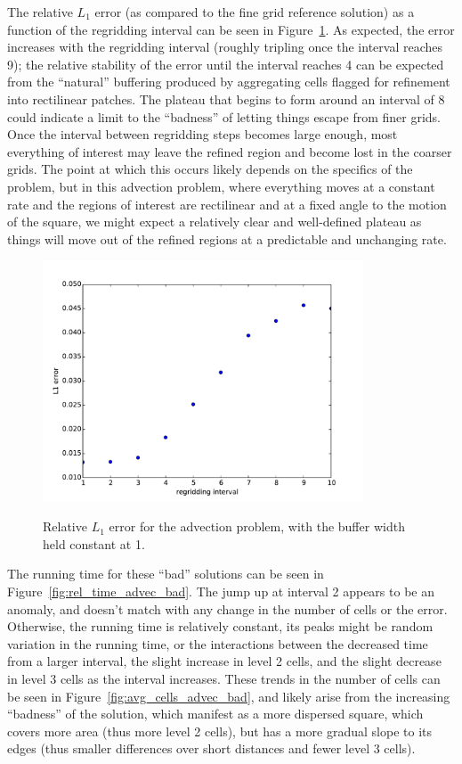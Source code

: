 \documentclass[11pt]{article}
\begin{document}
The relative $L_1$ error (as compared to the fine grid reference solution)
as a function of the regridding interval can be seen in 
Figure~\ref{fig:err_advec_bad}. As expected, the error increases with the
regridding interval (roughly tripling once the interval reaches 9); the 
relative stability of the error until the interval reaches 4 can be expected
from the ``natural'' buffering produced by aggregating cells flagged for 
refinement into rectilinear patches. 
The plateau that begins to form around an interval of 8 could indicate a limit
to the ``badness'' of letting things escape from finer grids. Once the interval
between regridding steps becomes large enough, most everything of interest
may leave the refined region and become lost in the coarser grids. The point
at which this occurs likely depends on the specifics of the problem, but in
this advection problem, where everything moves at a constant rate and the 
regions of interest are rectilinear and at a fixed angle to the motion of
the square, we might expect a relatively clear and well-defined plateau
as things will move out of the refined regions at a predictable and
unchanging rate.

\begin{figure}[!htb]
\centering
\caption{Relative $L_1$ error for the advection problem, with the buffer
width held constant at 1.}
\includegraphics[width=0.85\textwidth]{myclaw/l1_err_advec_bad}
\label{fig:err_advec_bad}
\end{figure}

The running time for these ``bad'' solutions can be seen in 
Figure~\ref{fig:rel_time_advec_bad}. The jump up at interval 2 appears
to be an anomaly, and doesn't match with any change in the number of
cells or the error. Otherwise, the running time is relatively constant,
its peaks might be random variation in the running time, or the interactions
between the decreased time from a larger interval, the slight increase in
level 2 cells, and the slight decrease in level 3 cells as the interval
increases. These trends in the number of cells can be seen in 
Figure~\ref{fig:avg_cells_advec_bad}, and likely arise from the increasing
``badness'' of the solution, which manifest as a more dispersed square,
which covers more area (thus more level 2 cells), but has a more gradual
slope to its edges (thus smaller differences over short distances and
fewer level 3 cells).
\end{document}
